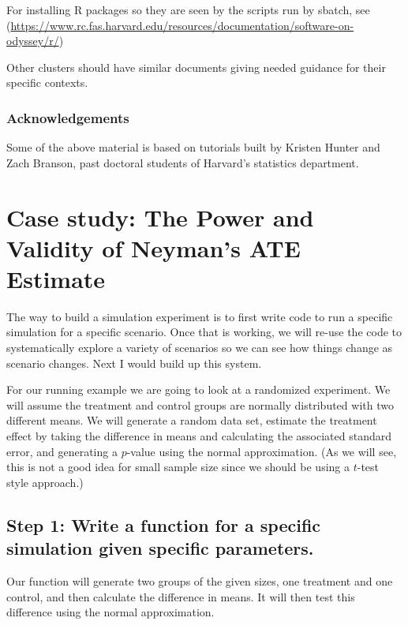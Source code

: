 \documentclass[
]{book}
\begin{document}
For installing R packages so they are seen by the scripts run by sbatch, see (\url{https://www.rc.fas.harvard.edu/resources/documentation/software-on-odyssey/r/})

Other clusters should have similar documents giving needed guidance for their specific contexts.

\hypertarget{acknowledgements}{%
\subsection{Acknowledgements}\label{acknowledgements}}

Some of the above material is based on tutorials built by Kristen Hunter and Zach Branson, past doctoral students of Harvard's statistics department.

\hypertarget{case-study-the-power-and-validity-of-neymans-ate-estimate}{%
\chapter{Case study: The Power and Validity of Neyman's ATE Estimate}\label{case-study-the-power-and-validity-of-neymans-ate-estimate}}

The way to build a simulation experiment is to first write code to run a
specific simulation for a specific scenario. Once that is working, we will
re-use the code to systematically explore a variety of scenarios so we can
see how things change as scenario changes. Next I would build up this system.

For our running example we are going to look at a randomized experiment. We
will assume the treatment and control groups are normally distributed with
two different means. We will generate a random data set, estimate the
treatment effect by taking the difference in means and calculating the
associated standard error, and generating a \(p\)-value using the normal
approximation. (As we will see, this is not a good idea for small sample
size since we should be using a \(t\)-test style approach.)

\hypertarget{step-1-write-a-function-for-a-specific-simulation-given-specific-parameters.}{%
\section{Step 1: Write a function for a specific simulation given specific parameters.}\label{step-1-write-a-function-for-a-specific-simulation-given-specific-parameters.}}

Our function will generate two groups of the given sizes, one treatment and
one control, and then calculate the difference in means. It will then test
this difference using the normal approximation.
\end{document}
